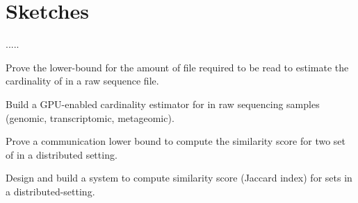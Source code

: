 \section{Sketches}



.....



\begin{rproblem}
Prove the lower-bound for the amount of file required to be read to estimate the cardinality of \kmer in a raw sequence file.
\end{rproblem}


\begin{rproblem}
Build a GPU-enabled cardinality estimator for \kmers in raw sequencing samples (genomic, transcriptomic, metageomic).
\end{rproblem}

\begin{rproblem}
Prove a communication lower bound to compute the similarity score for two set of \kmers in a distributed setting.
\end{rproblem}


\begin{rproblem}
Design and build a system to compute similarity score (Jaccard index) for \kmer sets in a distributed-setting.
\end{rproblem}
